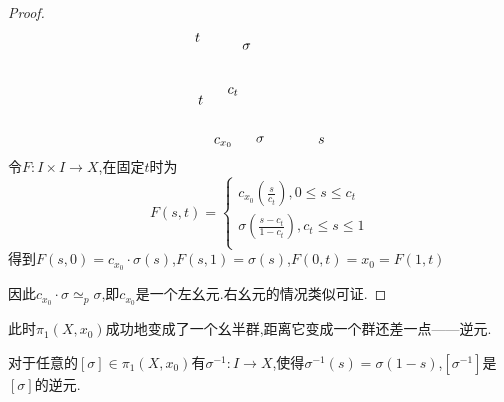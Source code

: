 \documentclass{article}
\begin{document}
\begin{proof}
\[\begin{tikzpicture}[x=0.75pt,y=0.75pt,yscale=-1,xscale=1]
    \draw (124,63.4) node [anchor=north west][inner sep=0.75pt]    {$t$};
    \draw (241.11,163.4) node [anchor=north west][inner sep=0.75pt]    {$s$};
    \draw (127,123.4) node [anchor=north west][inner sep=0.75pt]    {$t$};
    \draw (182,162.4) node [anchor=north west][inner sep=0.75pt]    {$\sigma $};
    \draw (169,73.4) node [anchor=north west][inner sep=0.75pt]    {$\sigma $};
    \draw (142,163.4) node [anchor=north west][inner sep=0.75pt]    {$c_{x_{0}}$};
    \draw (155,115.4) node [anchor=north west][inner sep=0.75pt]    {$c_{t}$};
    \end{tikzpicture}\]
    令$F : I \times I \to X$,在固定$t$时为
    $$
    F(s,t) = \left\{
        \begin{array}{c}
            c_{x_0}(\frac{s}{c_t}),0\leq s \leq c_t\\
            \sigma(\frac{s-c_t}{1-c_t}),c_t \leq s\leq 1\\
        \end{array}
    \right.
    $$
    得到$F(s,0) = c_{x_0}\cdot \sigma(s)$,$F(s,1) = \sigma(s)$,$F(0,t) = x_0 = F(1,t)$


    因此$c_{x_0} \cdot \sigma \simeq_p \sigma$,即$c_{x_0}$是一个左幺元.右幺元的情况类似可证.
\end{proof}
此时$\pi_1(X,x_0)$成功地变成了一个幺半群,距离它变成一个群还差一点——逆元.
\begin{lemma}
    对于任意的$[\sigma] \in \pi_1(X,x_0)$有$\sigma^{-1}: I \to X$,使得$\sigma^{-1}(s) = \sigma(1-s)$,$[\sigma^{-1}]$是$[\sigma]$的逆元.
    \label{lem:2.3.4}
\end{lemma}
\end{document}

